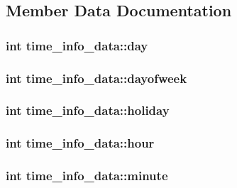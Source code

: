 \subsection{Member Data Documentation}
\hypertarget{structtime__info__data_a1f01632ffda7d65eac96af317c583314}{
\subsubsection[{day}]{\setlength{\rightskip}{0pt plus 5cm}int time\-\_\-info\-\_\-data\-::day}}\label{structtime__info__data_a1f01632ffda7d65eac96af317c583314}
\hypertarget{structtime__info__data_a25eb1efed1e6fa7b81bca031a9d747cd}{
\subsubsection[{dayofweek}]{\setlength{\rightskip}{0pt plus 5cm}int time\-\_\-info\-\_\-data\-::dayofweek}}\label{structtime__info__data_a25eb1efed1e6fa7b81bca031a9d747cd}
\hypertarget{structtime__info__data_a95146b927318947189e5b300e1e06ef2}{
\subsubsection[{holiday}]{\setlength{\rightskip}{0pt plus 5cm}int time\-\_\-info\-\_\-data\-::holiday}}\label{structtime__info__data_a95146b927318947189e5b300e1e06ef2}
\hypertarget{structtime__info__data_a0fcbcda81b3ab0a49d32a41744b137d9}{
\subsubsection[{hour}]{\setlength{\rightskip}{0pt plus 5cm}int time\-\_\-info\-\_\-data\-::hour}}\label{structtime__info__data_a0fcbcda81b3ab0a49d32a41744b137d9}
\hypertarget{structtime__info__data_a75276c6362e781fd5aa91b633a6b8213}{
\subsubsection[{minute}]{\setlength{\rightskip}{0pt plus 5cm}int time\-\_\-info\-\_\-data\-::minute}}\label{structtime__info__data_a75276c6362e781fd5aa91b633a6b8213}
